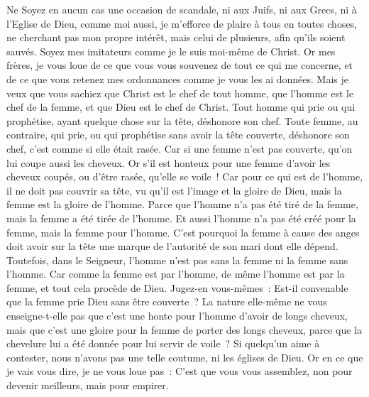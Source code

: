 \begin{multicols}{2}
Ne Soyez en aucun cas une occasion de scandale, ni aux Juifs, ni aux Grecs, ni à l'Eglise de Dieu,
comme moi aussi, je m'efforce de plaire à tous en toutes choses, ne cherchant pas mon propre intérêt, mais celui de plusieurs, afin qu'ils soient sauvés.
\VerseOne{}Soyez mes imitateurs comme je le suis moi-même de Christ.
Or mes frères, je vous loue de ce que vous vous souvenez de tout ce qui me concerne, et de ce que vous retenez mes ordonnances comme je vous les ai données.
Mais je veux que vous sachiez que Christ est le chef de tout homme, que l'homme est le chef de la femme, et que Dieu est le chef de Christ.
Tout homme qui prie ou qui prophétise, ayant quelque chose sur la tête, déshonore son chef.
Toute femme, au contraire, qui prie, ou qui prophétise sans avoir la tête couverte, déshonore son chef, c'est comme si elle était rasée.
Car si une femme n'est pas couverte, qu'on lui coupe aussi les cheveux. Or s'il est honteux pour une femme d'avoir les cheveux coupés, ou d'être rasée, qu'elle se voile~!
Car pour ce qui est de l'homme, il ne doit pas couvrir sa tête, vu qu'il est l'image et la gloire de Dieu, mais la femme est la gloire de l'homme.
Parce que l'homme n'a pas été tiré de la femme, mais la femme a été tirée de l'homme.
Et aussi l'homme n'a pas été créé pour la femme, mais la femme pour l'homme.
C'est pourquoi la femme à cause des anges doit avoir sur la tête une marque de l'autorité de son mari dont elle dépend.
Toutefois, dans le Seigneur, l'homme n'est pas sans la femme ni la femme sans l'homme.
Car comme la femme est par l'homme, de même l'homme est par la femme, et tout cela procède de Dieu.
Jugez-en vous-mêmes~: Est-il convenable que la femme prie Dieu sans être couverte~?
La nature elle-même ne vous enseigne-t-elle pas que c'est une honte pour l'homme d'avoir de longs cheveux,
mais que c'est une gloire pour la femme de porter des longs cheveux, parce que la chevelure lui a été donnée pour lui servir de voile~?
Si quelqu'un aime à contester, nous n'avons pas une telle coutume, ni les églises de Dieu.
Or en ce que je vais vous dire, je ne vous loue pas~: C'est que vous vous assemblez, non pour devenir meilleurs, mais pour empirer.

\end{multicols}
